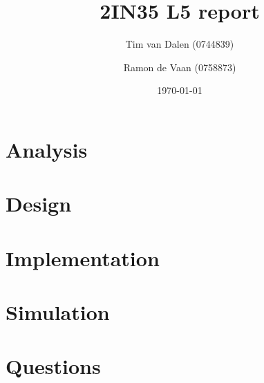 \documentclass[a4paper,11pt]{article}
\title{
	2IN35 L5 report
}
\author{
	Tim van Dalen (0744839)
	\and
	Ramon de Vaan (0758873)
}
\date{\today}
\begin{document}
	\maketitle

	\section{Analysis}
	

	\section{Design}
	

	\section{Implementation}
	

	\section{Simulation}
	

	\section{Questions}
	

	\appendix
	
\end{document}
